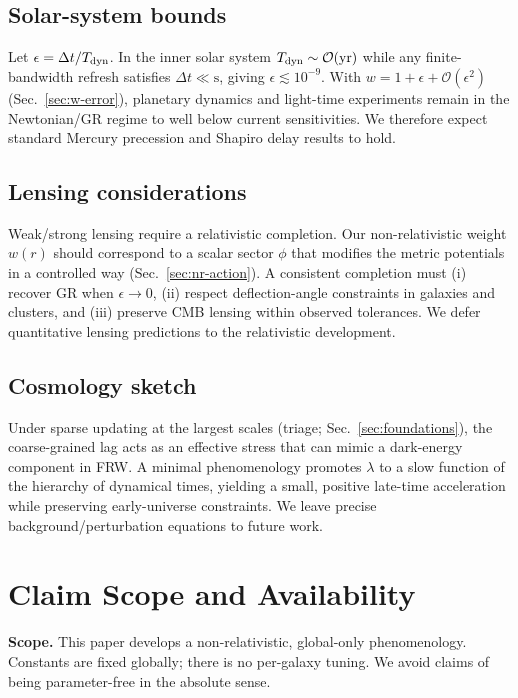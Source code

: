 \documentclass[twocolumn,prd,amsmath,amssymb,aps,superscriptaddress,nofootinbib]{revtex4-2}
\begin{document}
\subsection{Solar-system bounds}
\label{sec:solar}

Let $\epsilon=\Delta t/T_{\rm dyn}$. In the inner solar system $T_{\rm dyn}\sim\mathcal{O}(\mathrm{yr})$ while any finite-bandwidth refresh satisfies $\Delta t\ll\mathrm{s}$, giving $\epsilon\lesssim10^{-9}$. With $w=1+\epsilon+\mathcal{O}(\epsilon^2)$ (Sec.~\ref{sec:w-error}), planetary dynamics and light-time experiments remain in the Newtonian/GR regime to well below current sensitivities. We therefore expect standard Mercury precession and Shapiro delay results to hold.

\subsection{Lensing considerations}
\label{sec:lensing}

Weak/strong lensing require a relativistic completion. Our non-relativistic weight $w(r)$ should correspond to a scalar sector $\phi$ that modifies the metric potentials in a controlled way (Sec.~\ref{sec:nr-action}). A consistent completion must (i) recover GR when $\epsilon\to0$, (ii) respect deflection-angle constraints in galaxies and clusters, and (iii) preserve CMB lensing within observed tolerances. We defer quantitative lensing predictions to the relativistic development.

\subsection{Cosmology sketch}
\label{sec:cosmo}

Under sparse updating at the largest scales (triage; Sec.~\ref{sec:foundations}), the coarse-grained lag acts as an effective stress that can mimic a dark-energy component in FRW. A minimal phenomenology promotes $\lambda$ to a slow function of the hierarchy of dynamical times, yielding a small, positive late-time acceleration while preserving early-universe constraints. We leave precise background/perturbation equations to future work.

\section*{Claim Scope and Availability}
\noindent \textbf{Scope.} This paper develops a non-relativistic, global-only phenomenology. Constants are fixed globally; there is no per-galaxy tuning. We avoid claims of being parameter-free in the absolute sense.
\end{document}
